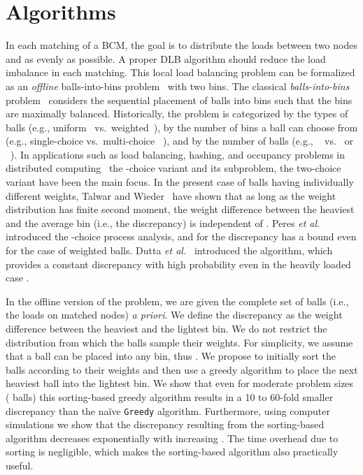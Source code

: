 \documentclass[12pt,psfig,a4]{article}
\newcommand{\gr}{\texttt{Greedy}}
\theoremstyle{plain}
\begin{document}
\section{Algorithms}
\label{sec:alg}
In each matching of a BCM, the goal is to distribute the loads between two nodes  and  as evenly as possible. A proper DLB algorithm should reduce the load imbalance in each matching. This local load balancing problem can be formalized as an \textit{offline} balls-into-bins problem~\cite{raab1998balls,berenbrink2006balanced} with two bins. The classical \textit{balls-into-bins} problem~\cite{johnson1977urn,kolchin1978random} considers the sequential placement of  balls into  bins such that the bins are maximally balanced. Historically, the problem is categorized by the types of balls (e.g., uniform~\cite{azar1994balanced,azar1999balanced} vs.~weighted~\cite{berenbrink2008weighted,talwar2007balanced,peres20101+,dutta2011perfectly}), by the number of bins a ball can choose from (e.g., single-choice vs.~multi-choice~ \cite{mitzenmacher2001power}), and by the number of balls (e.g., ~\cite{raab1998balls} vs.~ or ~\cite{berenbrink2006balanced}). In applications such as load balancing, hashing, and occupancy problems in distributed computing~\cite{berenbrink2008weighted,berenbrink2006balanced,czumaj2003perfectly} the -choice variant and its subproblem, the two-choice variant have been the main focus. In the present case of balls having individually different weights, Talwar and Wieder~\cite{talwar2007balanced} have shown that as long as the weight distribution has finite second moment, the weight difference between the heaviest and the average bin (i.e., the discrepancy) is independent of . Peres \textit{et al.}~\cite{peres20101+} introduced the -choice process analysis, and for  the discrepancy has a bound  even for the case of weighted balls. Dutta \textit{et al.}~\cite{dutta2011perfectly} introduced the  algorithm, which provides a constant discrepancy with high probability even in the heavily loaded case . 
 
In the offline version of the problem, we are given the complete set of balls (i.e., the loads on matched nodes) \textit{a priori}. We define the discrepancy as the weight difference between the heaviest and the lightest bin. We do not restrict the distribution from which the balls sample their weights. For simplicity, we assume that a ball can be placed into any bin, thus . We propose to initially sort the balls according to their weights and then use a greedy algorithm to place the next heaviest ball into the lightest bin. We show that even for moderate problem sizes ( balls) this sorting-based greedy algorithm results in a 10 to 60-fold smaller discrepancy than the na\"{i}ve \gr{} algorithm. Furthermore, using computer simulations we show that the discrepancy resulting from the sorting-based algorithm decreases exponentially with increasing . The time overhead due to sorting is negligible, which makes the sorting-based algorithm also practically useful. 
\end{document}
